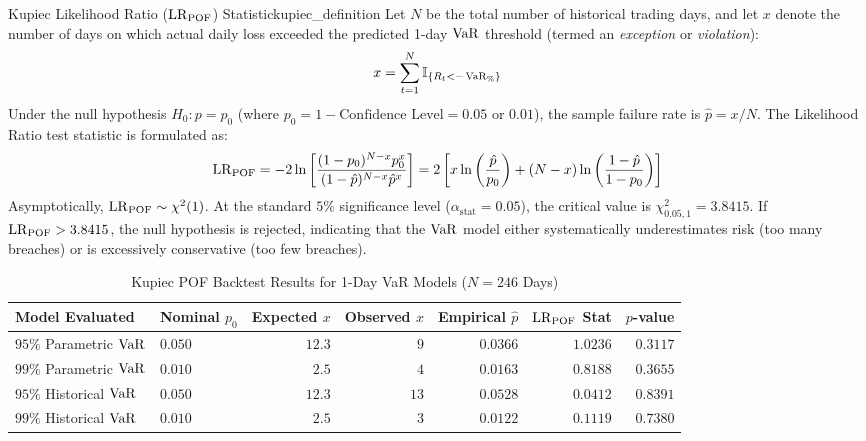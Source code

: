 \begin{definition}{Kupiec Likelihood Ratio ($\operatorname{LR}_{\operatorname{POF}}$) Statistic}{kupiec_definition}
Let $N$ be the total number of historical trading days, and let $x$ denote the number of days on which actual daily loss exceeded the predicted 1-day $\operatorname{VaR}$ threshold (termed an \textit{exception} or \textit{violation}):
\begin{equation}
x = \sum_{t=1}^{N} \mathbb{I}_{\{R_t < -\operatorname{VaR}_{\%}\}}
\end{equation}
Under the null hypothesis $H_0: p = p_0$ (where $p_0 = 1 - \text{Confidence Level} = 0.05$ or $0.01$), the sample failure rate is $\hat{p} = x / N$. The Likelihood Ratio test statistic is formulated as:
\begin{equation}
\operatorname{LR}_{\operatorname{POF}} = -2 \ln \left[ \frac{(1 - p_0)^{N - x} p_0^x}{(1 - \hat{p})^{N - x} \hat{p}^x} \right] = 2 \left[ x \ln\left(\frac{\hat{p}}{p_0}\right) + (N - x) \ln\left(\frac{1 - \hat{p}}{1 - p_0}\right) \right]
\label{eq:kupiec_lr}
\end{equation}
Asymptotically, $\operatorname{LR}_{\operatorname{POF}} \sim \chi^2(1)$. At the standard $5\%$ significance level ($\alpha_{\text{stat}} = 0.05$), the critical value is $\chi^2_{0.05, 1} = 3.8415$. If $\operatorname{LR}_{\operatorname{POF}} > 3.8415$, the null hypothesis is rejected, indicating that the $\operatorname{VaR}$ model either systematically underestimates risk (too many breaches) or is excessively conservative (too few breaches).
\end{definition}

\begin{table}[htbp]
\centering
\small
\caption{Kupiec POF Backtest Results for 1-Day VaR Models ($N = 246$ Days)}
\label{tab:kupiec_results}
\begin{tabularx}{\linewidth}{lXrrrrr}
\toprule
\textbf{Model Evaluated} & \textbf{Nominal $p_0$} & \textbf{Expected $x$} & \textbf{Observed $x$} & \textbf{Empirical $\hat{p}$} & \textbf{$\operatorname{LR}_{\operatorname{POF}}$ Stat} & \textbf{$p$-value} \\
\midrule
$95\%$ Parametric $\operatorname{VaR}$ & $0.050$ & $12.3$ & $9$ & $0.0366$ & $1.0236$ & $0.3117$ \\
$99\%$ Parametric $\operatorname{VaR}$ & $0.010$ & $2.5$ & $4$ & $0.0163$ & $0.8188$ & $0.3655$ \\
$95\%$ Historical $\operatorname{VaR}$ & $0.050$ & $12.3$ & $13$ & $0.0528$ & $0.0412$ & $0.8391$ \\
$99\%$ Historical $\operatorname{VaR}$ & $0.010$ & $2.5$ & $3$ & $0.0122$ & $0.1119$ & $0.7380$ \\
\bottomrule
\end{tabularx}
\end{table}

